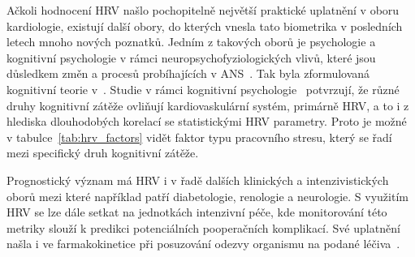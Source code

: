Ačkoli hodnocení HRV našlo pochopitelně největší praktické uplatnění v oboru
kardiologie, existují další obory, do kterých vnesla tato biometrika v
posledních letech mnoho nových poznatků. Jedním z takových oborů je psychologie
a kognitivní psychologie v rámci neuropsychofyziologických vlivů, které jsou
důsledkem změn a procesů probíhajících v ANS~\cite{Bernardi2009}. Tak byla
zformulovaná kognitivní teorie v~\cite{Forte2019,Plass2010}. Studie v rámci
kognitivní
psychologie~\cite{Bernardi2009,Solhjoo2019,Salahuddin2007,Ishaque2020}
potvrzují, že různé druhy kognitivní zátěže ovliňují kardiovaskulární systém,
primárně HRV, a to i z hlediska dlouhodobých korelací se statistickými HRV
parametry. Proto je možné v tabulce~\ref{tab:hrv_factors} vidět faktor typu
pracovního stresu, který se řadí mezi specifický druh kognitivní zátěže.

Prognostický význam má HRV i v řadě dalších klinických a intenzivistických oborů
mezi které například patří diabetologie, renologie a neurologie. S využitím HRV
se lze dále setkat na jednotkách intenzivní péče, kde monitorování této metriky
slouží k predikci potenciálních pooperačních komplikací. Své uplatnění našla i
ve farmakokinetice při posuzování odezvy organismu na podané
léčiva~\cite{Pumprla2014}.

